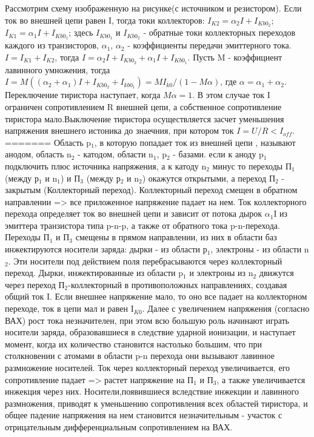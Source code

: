 Рассмотрим схему изображенную на рисунке(с источником и резистором). Если ток во внешней цепи равен I, тогда токи коллекторов:
$I_{K2} = \alpha_2I+I_{{Kb0}_2}$; $I_{K1} = \alpha_1I+I_{{Kb0}_1}$;
здесь $I_{{Kb0}_1}$ и $I_{{Kb0}_2}$ - обратные токи коллекторных переходов каждого из транзисторов, $\alpha_1$, $\alpha_2$ - коэффициенты передачи эмиттерного тока. $I = I_{K1}+I_{K2}$, тогда  $I = \alpha_2I+I_{{Kb0}_2} + \alpha_1I+I_{{Kb0}_1}$.
Пусть M - коэффициент лавинного умножения, тогда $I = M( (\alpha_2 + \alpha_1)I+I_{{Kb0}_2} + I_{{kb0}_1}) = MI_{k0}/(1-M\alpha) $, где $\alpha = \alpha_1+\alpha_2$. Переключение тиристора наступает, когда $M\alpha = 1$. В этом случае ток I ограничен сопротивлением R внешней цепи, а собственное сопротивление тиристора мало.Выключение тиристора осуществляется засчет уменьшения напряжения внешнего истоника до знаечния, при котором ток $I=U/R < I_{off}$.
=======
Область p$_1$, в которую попадает ток из внешней цепи , называют анодом, область n$_2$  - катодом, области n$_1$, p$_2$ - базами. если к аноду p$_1$ подключить плюс источника напряжения, а к катоду n$_2$ минус то переходы П$_1$ (между р$_1$ и n$_1$) и  П$_3$ (между р$_2$ и n$_2$) окажутся открытыми, а переход П$_2$ - закрытым (Коллекторный переход). Коллекторный переход смещен в обратном направлении => все приложенное напряжение падает на нем. Ток коллекторного перехода определяет ток во внешней цепи и зависит от потока дырок $\alpha_1$I из эмиттера транзистора типа p-n-p, а также от обратного тока p-n-перехода. Переходы П$_1$ и П$_3$ смещены в прямом направлении, из них в области баз инжектируются носители заряда: дырки - из области р$_1$, электроны - из области n$_2$. Эти носители под действием поля перебрасываются через коллекторный переход. Дырки, инжектированные из области p$_1$ и электроны из n$_2$ движутся через переход П$_2$-коллекторный в противоположных направлениях, создавая общий ток I. Если внешнее напряжение мало, то оно все падает на коллекторном переходе, ток в цепи мал и равен I$_{K0}$. Далее с увеличением напряжения (согласно ВАХ) рост тока незначителен, при этом всю большую роль начинают играть носители заряда, образовавшиеся в следствие ударной ионизации, и наступает момент, когда их количество становится настолько большим, что при столкновении с атомами в области p-n перехода они вызывают лавинное размножение носителей. Ток через коллекторный переход увеличивается, его сопротивление падает => растет напряжение на П$_1$ и П$_3$, а также увеличивается инжекция через них. Носители,появившиеся вследствие инжекции и лавинного размножения, приводят к уменьшению сопротивления всех областей тиристора, и общее падение напряжения на нем становится незначительным - участок с отрицательным дифференциальным сопротивлением на ВАХ.


